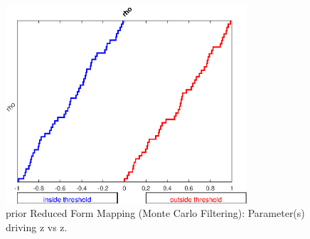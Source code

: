 
\begin{figure}[H]
\centering 
\includegraphics[width=0.8\textwidth]{RBC_kz/gsa/redform_prior/z_vs_z_threshold/RBC_kz_prior_z_vs_z_threshold}
\caption{prior Reduced Form Mapping (Monte Carlo Filtering): Parameter(s) driving z vs z.}\label{Fig:RBC_kz_prior_z_vs_z_threshold}
\end{figure}

